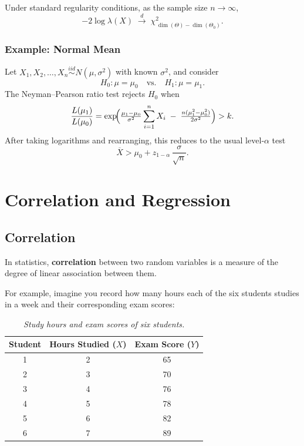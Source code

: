\documentclass[twoside]{book}
\begin{document}
Under standard regularity conditions, as the sample size $n\to\infty$,
\[
-2\log\lambda(X)
\;\xrightarrow{d}\;
\chi^2_{\,\dim(\Theta)-\dim(\Theta_0)}.
\]

\subsection{Example: Normal Mean}
Let $X_1,X_2,\dots,X_n \overset{iid}{\sim} N(\mu,\sigma^2)$ with known $\sigma^2$, and consider
\[
H_0:\mu=\mu_0
\quad\text{vs.}\quad
H_1:\mu=\mu_1.
\]
The Neyman–Pearson ratio test rejects $H_0$ when
\[
\frac{L(\mu_1)}{L(\mu_0)}
=
\exp\!\Bigl(\tfrac{\mu_1-\mu_0}{\sigma^2}\sum_{i=1}^n X_i
\;-\;\tfrac{n(\mu_1^2-\mu_0^2)}{2\sigma^2}\Bigr)
> k.
\]
After taking logarithms and rearranging, this reduces to the usual level‑$\alpha$ test
\[
\overline X > \mu_0 + z_{1-\alpha}\,\frac{\sigma}{\sqrt n}.
\]

\chapter{Correlation and Regression}

\section{Correlation}

\begin{textbox}
In statistics, \textbf{correlation} between two random variables is a measure of the degree of linear association between them.
\end{textbox}
 For example, imagine you record how many hours each of the six students studies in a week and their corresponding exam scores:

\begin{table}[h!]
	\centering
	\begin{tabular}{c|c|c}
		\toprule
		\textbf{Student} & \textbf{Hours Studied} ($X$) & \textbf{Exam Score} ($Y$) \\
		\midrule
		1 & 2 & 65 \\
		2 & 3 & 70 \\
		3 & 4 & 76 \\
		4 & 5 & 78 \\
		5 & 6 & 82 \\
		6 & 7 & 89 \\
		\bottomrule
	\end{tabular}
	\caption{\textit{Study hours and exam scores of six students.}}
	\label{tab:study_scores}
\end{table}
\end{document}
